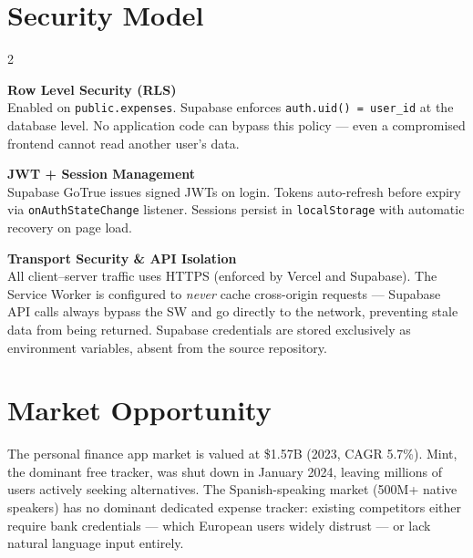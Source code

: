 \documentclass[a4paper,10pt]{article}
\begin{document}
\section{Security Model}

\begin{multicols}{2}
\begin{tcolorbox}[greenbox]
  {\small\bfseries\color{ngreen}Row Level Security (RLS)}\\[3pt]
  {\small\color{tw}
    Enabled on \texttt{public.expenses}.
    Supabase enforces \texttt{auth.uid() = user\_id}
    at the database level. No application code can
    bypass this policy --- even a compromised frontend
    cannot read another user's data.
  }
\end{tcolorbox}

\columnbreak

\begin{tcolorbox}[cyanbox]
  {\small\bfseries\color{ncyan}JWT + Session Management}\\[3pt]
  {\small\color{tw}
    Supabase GoTrue issues signed JWTs on login.
    Tokens auto-refresh before expiry via
    \texttt{onAuthStateChange} listener.
    Sessions persist in \texttt{localStorage}
    with automatic recovery on page load.
  }
\end{tcolorbox}
\end{multicols}

\begin{tcolorbox}[purplebox]
  {\small\bfseries\color{npurple}Transport Security \& API Isolation}\\[3pt]
  {\small\color{tw}
    All client--server traffic uses HTTPS (enforced by Vercel and Supabase).
    The Service Worker is configured to \emph{never} cache cross-origin
    requests --- Supabase API calls always bypass the SW and go directly to
    the network, preventing stale data from being returned.
    Supabase credentials are stored exclusively as environment variables,
    absent from the source repository.
  }
\end{tcolorbox}

\vspace{4pt}

\section{Market Opportunity}

{\small
The personal finance app market is valued at \$1.57B (2023, CAGR 5.7\%).
Mint, the dominant free tracker, was shut down in January 2024, leaving
millions of users actively seeking alternatives.
The Spanish-speaking market (500M+ native speakers) has no dominant
dedicated expense tracker: existing competitors either require bank
credentials --- which European users widely distrust --- or lack natural
language input entirely.
}
\end{document}
